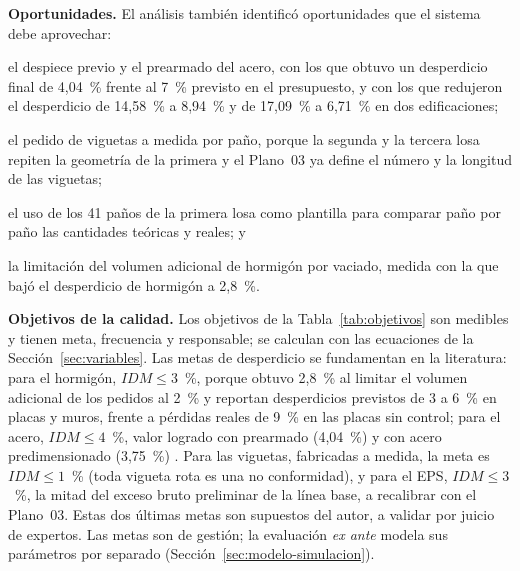 \textbf{Oportunidades.} El análisis también identificó oportunidades que el sistema debe aprovechar:
\begin{enumerate*}[label=(\alph*)]
  \item el despiece previo y el prearmado del acero, con los que \textcite[p.~75]{galarza2011} obtuvo un desperdicio final de 4,04~\% frente al 7~\% previsto en el presupuesto, y con los que \textcite[p.~192]{chino2024} redujeron el desperdicio de 14,58~\% a 8,94~\% y de 17,09~\% a 6,71~\% en dos edificaciones;
  \item el pedido de viguetas a medida por paño, porque la segunda y la tercera losa repiten la geometría de la primera y el Plano~03 ya define el número y la longitud de las viguetas;
  \item el uso de los 41 paños de la primera losa como plantilla para comparar paño por paño las cantidades teóricas y reales; y
  \item la limitación del volumen adicional de hormigón por vaciado, medida con la que \textcite[p.~73]{galarza2011} bajó el desperdicio de hormigón a 2,8~\%.
\end{enumerate*}

\textbf{Objetivos de la calidad.} Los objetivos de la Tabla~\ref{tab:objetivos} son medibles y tienen meta, frecuencia y responsable; se calculan con las ecuaciones de la Sección~\ref{sec:variables}. Las metas de desperdicio se fundamentan en la literatura: para el hormigón, $IDM \leq 3$~\%, porque \textcite[p.~73]{galarza2011} obtuvo 2,8~\% al limitar el volumen adicional de los pedidos al 2~\% y \textcite[pp.~33, 69]{rojas2018} reportan desperdicios previstos de 3 a 6~\% en placas y muros, frente a pérdidas reales de 9~\% en las placas sin control; para el acero, $IDM \leq 4$~\%, valor logrado con prearmado (4,04~\%) y con acero predimensionado (3,75~\%) \parencite[pp.~75--76]{galarza2011}. Para las viguetas, fabricadas a medida, la meta es $IDM \leq 1$~\% (toda vigueta rota es una no conformidad), y para el EPS, $IDM \leq 3$~\%, la mitad del exceso bruto preliminar de la línea base, a recalibrar con el Plano~03. Estas dos últimas metas son supuestos del autor, a validar por juicio de expertos. Las metas son de gestión; la evaluación \emph{ex ante} modela sus parámetros por separado (Sección~\ref{sec:modelo-simulacion}).

